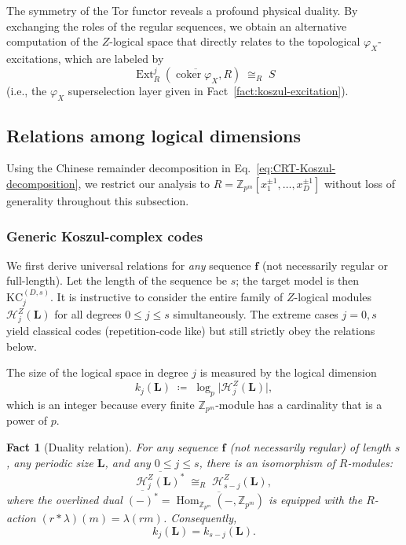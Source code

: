 \documentclass[aps,prx,english,superscriptaddress,twocolumn,tightenlines,showpacs,longbibliography,floatfix,amsfonts]{revtex4-2}
\newtheorem{fact}{Fact}
\theoremstyle{remark}
\theoremstyle{definition}
\begin{document}
The symmetry of the Tor functor reveals a profound physical duality. By exchanging the roles of the regular sequences, we obtain an alternative computation of the $Z$-logical space that directly relates to the topological $\varphi_X$-excitations, which are labeled by
\[
\operatorname{Ext}_R^j(\overline{\operatorname{coker}\varphi_X},R) \;\cong_R\; S
\]
(i.e., the $\varphi_X$ superselection layer given in Fact~\ref{fact:koszul-excitation}).

\subsection{Relations among logical dimensions}
\label{subsec:relations-logical-modules}

Using the Chinese remainder decomposition in Eq.~\eqref{eq:CRT-Koszul-decomposition}, we restrict our analysis to $R = \mathbb{Z}_{p^m}[x_1^{\pm1},\dots,x_D^{\pm1}]$ without loss of generality throughout this subsection.

\subsubsection{Generic Koszul-complex codes}

We first derive universal relations for \emph{any} sequence $\mathbf{f}$ (not necessarily regular or full-length).
Let the length of the sequence be $s$; the target model is then $\mathrm{KC}_j^{(D,s)}$.
It is instructive to consider the entire family of $Z$-logical modules $\mathcal{H}_j^Z(\mathbf{L})$ for all degrees $0\le j\le s$ simultaneously. The extreme cases $j=0,s$ yield classical codes (repetition-code like) but still strictly obey the relations below.

The size of the logical space in degree $j$ is measured by the logical dimension
\begin{equation}
	k_j(\mathbf{L}) \;\coloneqq\; \log_{p}\bigl|\mathcal{H}_j^Z(\mathbf{L})\bigr|,
\end{equation}
which is an integer because every finite $\mathbb{Z}_{p^m}$-module has a cardinality that is a power of $p$.

\begin{fact}[Duality relation]
	For any sequence \(\mathbf{f}\) (not necessarily regular) of length $s$, any periodic size \(\mathbf{L}\), and any \(0 \le j \le s\), there is an isomorphism of \(R\)-modules:
	\begin{equation}
		\overline{\mathcal{H}_j^Z(\mathbf{L})^\ast} \;\cong_R\; \mathcal{H}_{s-j}^Z(\mathbf{L}),
		\label{eq:module-duality}
	\end{equation}
	where the overlined dual $\overline{(-)^\ast} = \overline{\operatorname{Hom}_{\mathbb{Z}_{p^m}}(-, \mathbb{Z}_{p^m})}$ is equipped with the $R$-action $(r * \lambda)(m) = \lambda(rm)$. Consequently,
	\begin{equation}
		k_j(\mathbf{L}) = k_{s-j}(\mathbf{L}).
		\label{eq:k_duality}
	\end{equation}
\end{fact}
\end{document}
